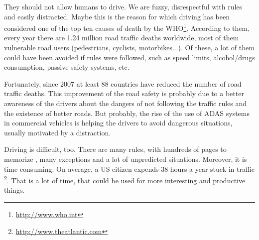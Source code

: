 
\graphicspath{{./images/chapter00/bmps/}{./images/chapter00/vects/}{./images/chapter00/}}

\label{ch:chapter00}


They should not allow humans to drive. We are fuzzy, disrespectful with rules and easily distracted. Maybe this is the reason for which driving has been considered one of the top ten causes of death by the \ac{WHO}\footnote{\href{http://www.who.int/features/factfiles/roadsafety/en/}{http://www.who.int}}. According to them, every year there are 1.24 million road traffic deaths worldwide, most of them vulnerable road users (pedestrians, cyclists, motorbikes...). Of these, a lot of them could have been avoided if rules were followed, such as speed limits, alcohol/drugs consumption, passive safety systems, etc. 

Fortunately, since 2007 at least 88 countries have reduced the number of road traffic deaths. This improvement of the road safety is probably due to a better awareness of the drivers about the dangers of not following the traffic rules and the existence of better roads. But probably, the rise of the use of \ac{ADAS} systems in commercial vehicles is helping the drivers to avoid dangerous situations, usually motivated by a distraction.

Driving is difficult, too. There are many rules, with hundreds of pages to memorize \citep{schwarzenegger2007california}, many exceptions and a lot of unpredicted situations. Moreover, it is time consuming. On average, a US citizen expends 38 hours a year stuck in traffic \footnote{\href{http://www.theatlantic.com/business/archive/2013/02/the-american-commuter-spends-38-hours-a-year-stuck-in-traffic/272905}{http://www.theatlantic.com}}. That is a lot of time, that could be used for more interesting and productive things.

